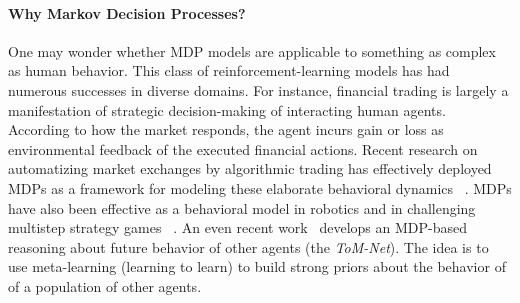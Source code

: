 \documentclass[10pt,letterpaper]{article}
\begin{document}
\paragraph*{Why Markov Decision Processes?} One may wonder whether MDP models
are applicable to something as complex as human behavior. This class of
reinforcement-learning models has had numerous successes in diverse domains. For instance, financial trading is largely a manifestation of strategic decision-making of interacting human agents. According to how the market responds, the agent incurs gain or loss as environmental feedback of the executed financial actions. Recent research on automatizing market exchanges by algorithmic trading has effectively deployed MDPs as a framework for modeling these elaborate behavioral dynamics  ~\citep{brazdil2017,yang15,yang14,yang12,dempster2006,hult2010, abergel2017}.
%
MDPs have also been effective as a behavioral model in robotics
\citep{ng2004,abbeel2004} and in challenging multistep strategy games
~\citep{mnih2015,silver2016mastering,pritzel2017neural}. An even recent work~\citep{robinowitz2018}
develops an MDP-based reasoning about future behavior
of other agents (the \textit{ToM-Net}).
The idea is to use meta-learning (learning to learn) to build strong priors
about the behavior of of a population of other agents.




\end{document}
